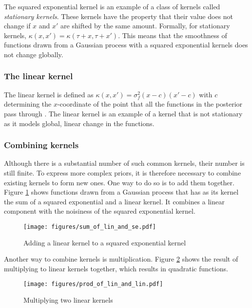 \documentclass[a4paper,12pt,twoside,openright]{report}
\begin{document}
The squared exponential kernel is an example of a class of kernels called \emph{stationary kernels}. These kernels  have the property that their value does not change if $x$ and $x'$ are shifted by the same amount. Formally, for stationary kernels, $\kappa(x, x') = \kappa(\tau + x, \tau + x')$. This means that the smoothness of functions drawn from a Gaussian process with a squared exponential kernels does not change globally.


\subsubsection{The linear kernel}
The linear kernel is defined as $\kappa(x, x') = \sigma_f^2(x-c)(x'-c)$ with $c$ determining the $x$-coordinate of the point that all the functions in the posterior pass through \cite{duvenaudthesis}. The linear kernel is an example of a kernel that is not stationary as it models global, linear change in the functions.


\subsubsection{Combining kernels}
Although there is a substantial number of such common kernels, their number is still finite. To express more complex priors, it is therefore necessary to combine existing kernels to form new ones. One way to do so is to add them together. Figure \ref{sum_of_lin_and_se} shows functions drawn from a Gaussian process that has as its kernel the sum of a squared exponential and a linear kernel. It combines a linear component with the noisiness of the squared exponential kernel.

\begin{figure}
\centering
  \texttt{[image: figures/sum\_of\_lin\_and\_se.pdf]}
  \caption{Adding a linear kernel to a squared exponential kernel}
  \label{sum_of_lin_and_se}
\end{figure}

Another way to combine kernels is multiplication. Figure \ref{prod_of_lin_and_lin} shows the result of multiplying to linear kernels together, which results in quadratic functions.

\begin{figure}
\centering
  \texttt{[image: figures/prod\_of\_lin\_and\_lin.pdf]}
  \caption{Multiplying two linear kernels}
  \label{prod_of_lin_and_lin}
\end{figure}
\end{document}
